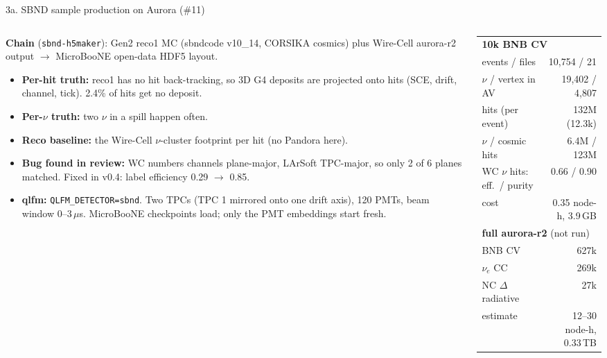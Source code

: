 \documentclass[aspectratio=169,10pt]{beamer}
\newcommand{\code}[1]{\texttt{#1}}
\newcommand{\iss}[1]{{\color{blue!60!black}\##1}}
\begin{document}
\begin{frame}{3a. SBND sample production on Aurora (\iss{11})}
  \footnotesize
  \begin{columns}[T]
    \begin{column}{0.54\textwidth}
      \textbf{Chain} (\code{sbnd-h5maker}): Gen2 reco1 MC (sbndcode v10\_14, CORSIKA cosmics) plus Wire-Cell aurora-r2 output $\rightarrow$ MicroBooNE open-data HDF5 layout.
      \begin{itemize}\setlength{\itemsep}{2pt}
        \item \textbf{Per-hit truth:} reco1 has no hit back-tracking, so 3D G4 deposits are projected onto hits (SCE, drift, channel, tick). 2.4\% of hits get no deposit.
        \item \textbf{Per-$\nu$ truth:} two $\nu$ in a spill happen often.
        \item \textbf{Reco baseline:} the Wire-Cell $\nu$-cluster footprint per hit (no Pandora here).
        \item \textbf{Bug found in review:} WC numbers channels plane-major, LArSoft TPC-major, so only 2 of 6 planes matched.
          Fixed in v0.4: label efficiency 0.29 $\rightarrow$ 0.85.
        \item \textbf{qlfm:} \code{QLFM\_DETECTOR=sbnd}. Two TPCs (TPC 1 mirrored onto one drift axis), 120 PMTs, beam window 0--3\,$\mu$s.
          MicroBooNE checkpoints load; only the PMT embeddings start fresh.
      \end{itemize}
    \end{column}
    \begin{column}{0.44\textwidth}
      \centering
      \scriptsize
      \begin{tabular}{lr}
        \toprule
        \multicolumn{2}{l}{\textbf{10k BNB CV}} \\
        events / files & 10,754 / 21 \\
        $\nu$ / vertex in AV & 19,402 / 4,807 \\
        hits (per event) & 132M (12.3k) \\
        $\nu$ / cosmic hits & 6.4M / 123M \\
        WC $\nu$ hits: eff.\ / purity & 0.66 / 0.90 \\
        cost & 0.35 node-h, 3.9\,GB \\
        \midrule
        \multicolumn{2}{l}{\textbf{full aurora-r2} (not run)} \\
        BNB CV & 627k \\
        $\nu_e$ CC & 269k \\
        NC $\Delta$ radiative & 27k \\
        estimate & 12--30 node-h, 0.33\,TB \\
        \bottomrule
      \end{tabular}
    \end{column}
  \end{columns}
\end{frame}
\end{document}
